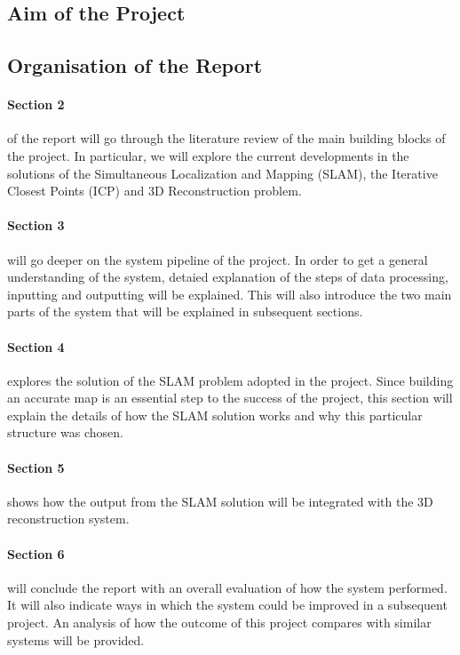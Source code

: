 \documentclass[11pt]{article}
\begin{document}
	\subsection{Aim of the Project}
	\subsection{ Organisation of the Report}
		\paragraph{Section 2} of the report will go through the literature review of the main building blocks of the project. In particular, we will explore the current developments in the solutions of the Simultaneous Localization and Mapping (SLAM), the Iterative Closest Points (ICP) and 3D Reconstruction problem.
		
		\paragraph{Section 3} will go deeper on the system pipeline of the project. In order to get a general understanding of the system, detaied explanation of the steps of data processing, inputting and outputting will be explained. This will also introduce the two main parts of the system that will be explained in subsequent sections.
		
		\paragraph{Section 4} explores the solution of the SLAM problem adopted in the project. Since building an accurate map is an essential step to the success of the project, this section will explain the details of how the SLAM solution works and why this particular structure was chosen.
		
		\paragraph{Section 5} shows how the output from the SLAM solution will be integrated with the 3D reconstruction system.
		
		\paragraph{Section 6} will conclude the report with an overall evaluation of how the system performed. It will also indicate ways in which the system could be improved in a subsequent project. An analysis of how the outcome of this project compares with similar systems will be provided.
\end{document}
